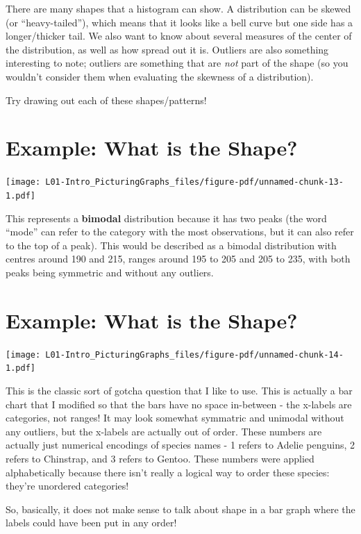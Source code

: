 \documentclass[
  letterpaper,
  DIV=11,
  numbers=noendperiod]{scrreprt}
\begin{document}
There are many shapes that a histogram can show. A distribution can be
skewed (or ``heavy-tailed''), which means that it looks like a bell
curve but one side has a longer/thicker tail. We also want to know about
several measures of the center of the distribution, as well as how
spread out it is. Outliers are also something interesting to note;
outliers are something that are \emph{not} part of the shape (so you
wouldn't consider them when evaluating the skewness of a distribution).

Try drawing out each of these shapes/patterns!

\hypertarget{example-what-is-the-shape}{%
\section{Example: What is the Shape?}\label{example-what-is-the-shape}}

\texttt{[image: L01-Intro\_PicturingGraphs\_files/figure-pdf/unnamed-chunk-13-1.pdf]}

This represents a \textbf{bimodal} distribution because it has two peaks
(the word ``mode'' can refer to the category with the most observations,
but it can also refer to the top of a peak). This would be described as
a bimodal distribution with centres around 190 and 215, ranges around
195 to 205 and 205 to 235, with both peaks being symmetric and without
any outliers.

\hypertarget{example-what-is-the-shape-1}{%
\section{Example: What is the
Shape?}\label{example-what-is-the-shape-1}}

\texttt{[image: L01-Intro\_PicturingGraphs\_files/figure-pdf/unnamed-chunk-14-1.pdf]}

This is the classic sort of gotcha question that I like to use. This is
actually a bar chart that I modified so that the bars have no space
in-between - the x-labels are categories, not ranges! It may look
somewhat symmatric and unimodal without any outliers, but the x-labels
are actually out of order. These numbers are actually just numerical
encodings of species names - 1 refers to Adelie penguins, 2 refers to
Chinstrap, and 3 refers to Gentoo. These numbers were applied
alphabetically because there isn't really a logical way to order these
species: they're unordered categories!

So, basically, it does not make sense to talk about shape in a bar graph
where the labels could have been put in any order!
\end{document}
